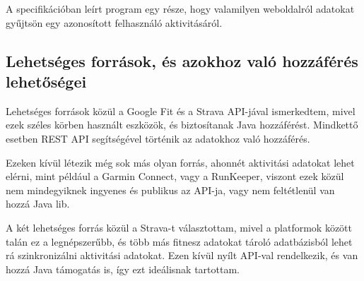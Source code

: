 A specifikációban leírt program egy része, hogy valamilyen weboldalról adatokat gyűjtsön egy azonosított felhasználó aktivitásáról. 

\subsection*{Lehetséges források, és azokhoz való hozzáférés lehetőségei}

Lehetséges források közül a Google Fit és a Strava API-jával ismerkedtem, mivel ezek széles körben használt eszközök, és biztosítanak Java hozzáférést. Mindkettő esetben REST API segítségével történik az adatokhoz való hozzáférés. 

Ezeken kívül létezik még sok más olyan forrás, ahonnét aktivitási adatokat lehet elérni, mint például a Garmin Connect, vagy a RunKeeper, viszont ezek közül nem mindegyiknek ingyenes és publikus az API-ja, vagy nem feltétlenül van hozzá Java lib. 

A két lehetséges forrás közül a Strava-t választottam, mivel a platformok között talán ez a legnépszerűbb, és több más fitnesz adatokat tároló adatbázisból lehet rá szinkronizálni aktivitási adatokat. Ezen kívül nyílt API-val rendelkezik, és van hozzá Java támogatás is, így ezt ideálisnak tartottam. 
